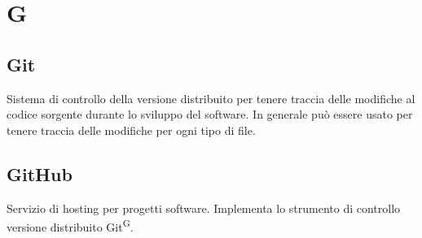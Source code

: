 \section{G}

\subsection{Git}
Sistema di controllo della versione distribuito per tenere traccia delle modifiche al codice sorgente durante lo sviluppo del software. In generale può essere usato per tenere traccia delle modifiche per ogni tipo di file.

\subsection{GitHub}
Servizio di hosting per progetti software. Implementa lo strumento di controllo versione distribuito Git\textsuperscript{G}.




\clearpage